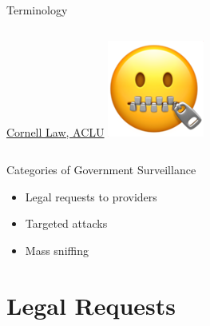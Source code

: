 \documentclass[nobackground,dvipsnames,table,aspectratio=169]{beamer}
\begin{document}
\begin{frame}{Terminology}
\begin{columns}[T]
            \scriptsize
            \href{https://www.law.cornell.edu/wex/surveillance}{Cornell Law, }\href{https://www.aclu.org/other/what-censorship}{ACLU}
            \includegraphics[width=\textwidth]{zipped}
    \end{columns}
\end{frame}

\begin{frame}{Categories of Government Surveillance}
    \begin{itemize}
        \item Legal requests to providers
        \item Targeted attacks
        \item Mass sniffing
    \end{itemize}
\end{frame}

\section{Legal Requests}

\begin{frame}{}
    \thispagestyle{empty}
\end{frame}
\end{document}
